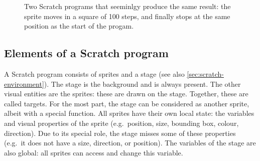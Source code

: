 \documentclass[../main]{subfiles}
\begin{document}
\begin{figure}
    \centering
    \begin{subfigure}{0.45\textwidth}
        \centering
        \begin{scratch}[scale=0.7]
        \end{scratch}
    \end{subfigure}
    \begin{subfigure}{0.45\textwidth}
        \centering
        \begin{scratch}[scale=0.7]
        \end{scratch}
    \end{subfigure}
    \caption{Two Scratch programs that seeminlgy produce the same result: the sprite moves in a square of 100 steps, and finally stops at the same position as the start of the progam.}\label{fig:scratch-two-programs}
\end{figure}

\subsection{Elements of a Scratch program}\label{subsec:elements-of-a-scratch-program}

A Scratch program consists of sprites and a stage (see also \cref{sec:scratch-environment}).
The stage is the background and is always present.
The other visual entities are the sprites: these are drawn on the stage.
Together, these are called targets.
For the most part, the stage can be considered as another sprite, albeit with a special function.
All sprites have their own local state: the variables and visual properties of the sprite (e.g.\ position, size, bounding box, colour, direction).
Due to its special role, the stage misses some of these properties (e.g.\ it does not have a size, direction, or position).
The variables of the stage are also global: all sprites can access and change this variable.
\end{document}
